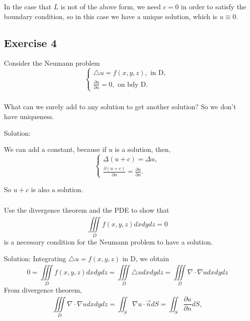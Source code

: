 \documentclass{article}
\begin{document}
		In the case that $L$ is not of the above form, we need $c=0$
		in order to satisfy the boundary condition, so in
		this case we have a unique solution, which is $u
		\equiv 0$.
		
		\subsection{Exercise 4}
		Consider the Neumann problem
		\begin{equation*}
			\begin{cases}
				\triangle u = f(x,y,z), \text{ in D, }
				\\
				\frac{\partial u}{\partial n}=0, \text{ on bdy D. }
			\end{cases}
		\end{equation*}
	
		\subsubsection{}
		What can we surely add to any
		solution to get another solution? So we
	don't have uniqueness.

		Solution:

		We can add a constant, because if $u$ is a solution,
		then,
		\begin{equation*}
			\begin{cases}
			\Delta(u+c)= \Delta u,
             \\
			 \frac{\partial(u+c)}{\partial n}=\frac{\partial u}{\partial n}.
			\end{cases}
		\end{equation*}
		


		So $u+c$ is also a solution.

	\subsubsection{}
	Use the divergence theorem and the PDE to show that
\[
\iiint\limits_{D}^{} f(x,y,z)dxdydz=0
\]
	is a necessary condition for the Neumann problem to have a solution.
		
		Solution: Integrating $\triangle u = f(x,y,z)$ in D, we obtain
		\[0= \iiint\limits_{D}^{} f(x,y,z)dxdydz=\iiint\limits_{D}^{} \triangle u dxdydz=\iiint\limits_{D}^{} \nabla \cdot \nabla u dxdydz
		\]
		From divergence theorem,
		\[\iiint\limits_{D}^{} \nabla \cdot \nabla u dxdydz=\iint_{S}^{} \nabla u \cdot \vec{n}dS=\iint_{S}^{} \frac{\partial u}{\partial n}dS,
			\]
\end{document}
